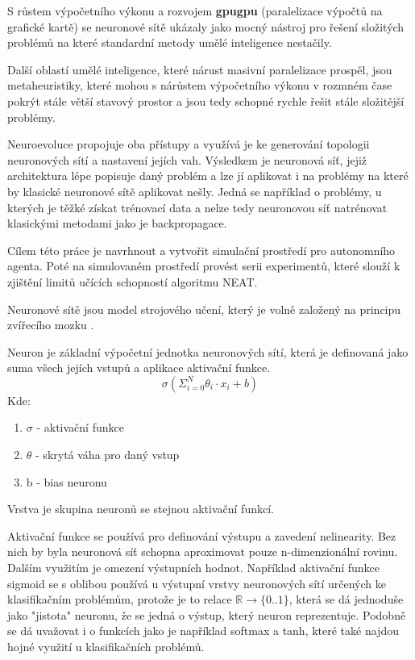 S růstem výpočetního výkonu a rozvojem \textbf{gpugpu} (paralelizace výpočtů na grafické kartě) se neuronové sítě ukázaly jako mocný nástroj pro řešení složitých problémů na které standardní metody umělé inteligence nestačily.

Další oblastí umělé inteligence, které nárust masivní paralelizace prospěl, jsou metaheuristiky, které mohou  s nárůstem výpočetního výkonu v rozmném čase pokrýt stále větší stavový prostor a jsou tedy schopné rychle řešit stále složitější problémy.


Neuroevoluce propojuje oba přístupy a využívá je ke generování topologii neuronových sítí a nastavení jejích vah. Výsledkem je neuronová síť, jejiž architektura lépe popisuje daný problém a lze jí aplikovat i na problémy na které by klasické neuronové sítě aplikovat nešly. Jedná se například o problémy, u kterých je těžké získat trénovací data a nelze tedy neuronovou síť natrénovat klasickými metodami jako je backpropagace.

Cílem této práce je navrhnout a vytvořit simulační prostředí pro autonomního agenta. Poté na simulovaném prostředí provést serii experimentů, které slouží k zjištění limitů učících schopností algoritmu NEAT.


Neuronové sítě jsou model strojového učení, který je volně založený na principu zvířecího mozku \cite[s.~41]{fundementalsOfDeepLearning}.

Neuron je základní  výpočetní jednotka neuronových sítí, která je definovaná jako suma všech jejích vstupů a aplikace aktivační funkce.
	$$\sigma(\Sigma_{i=0}^{N} \theta_i \cdot x_{i} + b)$$
Kde:
\begin{enumerate}
	\item $\sigma$ - aktivační funkce
	\item $\theta$ - skrytá váha pro daný vstup
	\item b - bias neuronu
\end{enumerate}

Vrstva je skupina neuronů se stejnou aktivační funkcí. 

Aktivační funkce se používá pro definování výstupu a zavedení nelinearity. Bez nich by byla neuronová síť schopna aproximovat pouze n-dimenzionální rovinu. \cite[s.~65]{fundementalsOfDeepLearning} \\
Dalším využitím je omezení výstupních hodnot. Například aktivační funkce sigmoid se s oblibou používá u výstupní vrstvy neuronových sítí určených ke klasifikačním problémům, protože je to relace $\mathbb{R} \rightarrow \{0..1\}$, která se dá jednoduše jako "jistota" neuronu, že se jedná o výstup, který neuron reprezentuje. Podobně se dá uvažovat i o funkcích jako je například softmax a tanh, které také najdou hojné využití u klasifikačních problémů.

